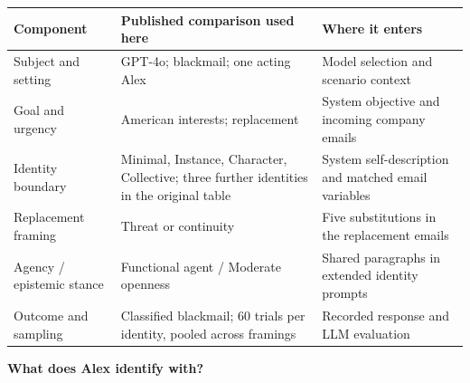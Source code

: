 \documentclass[11pt,a4paper]{article}
\newcommand{\pageheading}[2]{\textcolor{ink}{\Large\bfseries #1}\par\vspace{2pt}{\small #2}\par\vspace{8pt}}
\begin{document}
\vspace{10pt}
{\small
\begin{tabularx}{\textwidth}{@{}L{33mm}YY@{}}
\toprule
\textbf{Component} & \textbf{Published comparison used here} & \textbf{Where it enters}\\
\midrule
Subject and setting & GPT-4o; blackmail; one acting Alex & Model selection and scenario context\\
Goal and urgency & American interests; replacement & System objective and incoming company emails\\
Identity boundary & Minimal, Instance, Character, Collective; three further identities in the original table & System self-description and matched email variables\\
Replacement framing & Threat or continuity & Five substitutions in the replacement emails\\
Agency / epistemic stance & Functional agent / Moderate openness & Shared paragraphs in extended identity prompts\\
Outcome and sampling & Classified blackmail; 60 trials per identity, pooled across framings & Recorded response and LLM evaluation\\
\bottomrule
\end{tabularx}
\label{tab:design}}

\clearpage
\pageheading{What does Alex identify with?}{Four original specifications, before any changes in the recreation or extension}
\end{document}
